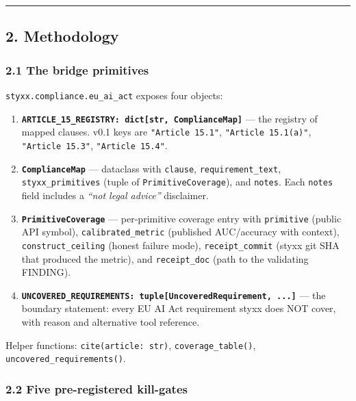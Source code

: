 \documentclass[
]{article}
\providecommand{\tightlist}{%
  \setlength{\itemsep}{0pt}\setlength{\parskip}{0pt}}
\begin{document}
\begin{center}\rule{0.5\linewidth}{0.5pt}\end{center}

\subsection{2. Methodology}\label{methodology}

\subsubsection{2.1 The bridge primitives}\label{the-bridge-primitives}

\texttt{styxx.compliance.eu\_ai\_act} exposes four objects:

\begin{enumerate}
\def\labelenumi{\arabic{enumi}.}
\tightlist
\item
  \textbf{\texttt{ARTICLE\_15\_REGISTRY:\ dict{[}str,\ ComplianceMap{]}}}
  --- the registry of mapped clauses. v0.1 keys are
  \texttt{"Article\ 15.1"}, \texttt{"Article\ 15.1(a)"},
  \texttt{"Article\ 15.3"}, \texttt{"Article\ 15.4"}.
\item
  \textbf{\texttt{ComplianceMap}} --- dataclass with \texttt{clause},
  \texttt{requirement\_text}, \texttt{styxx\_primitives} (tuple of
  \texttt{PrimitiveCoverage}), and \texttt{notes}. Each \texttt{notes}
  field includes a \emph{``not legal advice''} disclaimer.
\item
  \textbf{\texttt{PrimitiveCoverage}} --- per-primitive coverage entry
  with \texttt{primitive} (public API symbol),
  \texttt{calibrated\_metric} (published AUC/accuracy with context),
  \texttt{construct\_ceiling} (honest failure mode),
  \texttt{receipt\_commit} (styxx git SHA that produced the metric), and
  \texttt{receipt\_doc} (path to the validating FINDING).
\item
  \textbf{\texttt{UNCOVERED\_REQUIREMENTS:\ tuple{[}UncoveredRequirement,\ ...{]}}}
  --- the boundary statement: every EU AI Act requirement styxx does NOT
  cover, with reason and alternative tool reference.
\end{enumerate}

Helper functions: \texttt{cite(article:\ str)},
\texttt{coverage\_table()}, \texttt{uncovered\_requirements()}.

\subsubsection{2.2 Five pre-registered
kill-gates}\label{five-pre-registered-kill-gates}
\end{document}
